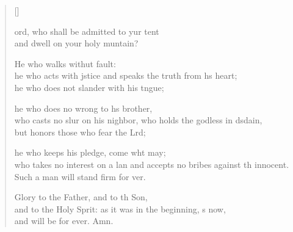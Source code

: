 \settowidth{\versewidth}{and accepts no bribes against the innocent. *}
\begin{verse}[\versewidth]
  \begin{patverse}
ord, who shall be admitted to yur tent\Med\\
and dwell on your holy muntain?

He who walks withut fault:\Med\\
he who acts with jstice
and speaks the truth from h\pointup{\i}s heart;\Med\\
he who does not slander with his tngue;

he who does no wrong to h\pointup{\i}s brother,\Med\\
who casts no slur on his nighbor,
who holds the godless in d\pointup{\i}sdain,\Med\\
but honors those who fear the Lrd;

he who keeps his pledge, come wht may;\Med\\
who takes no interest on a lan
and accepts no bribes against th innocent.\Med\\
Such a man will stand firm for ver.

Glory to the Father, and to th Son,\Med\\
and to the Holy Sp\pointup{\i}rit:
as it was in the beginning, \pointup{\i}s now,\Med\\
and will be for ever. Amn.
  \end{patverse}
\end{verse}
